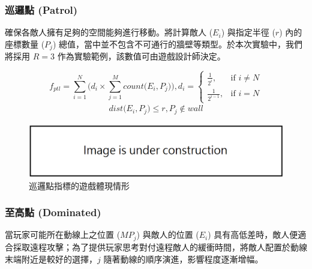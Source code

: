 \subsubsection{巡邏點 (Patrol)}
\label{sssec:method-segments-fitnesses-patrol}

確保各敵人擁有足夠的空間能夠進行移動。將計算敵人 ($E_{i}$) 與指定半徑 ($r$) 內的座標數量 ($P_j$) 總值，當中並不包含不可通行的牆壁等類型。於本次實驗中，我們將採用 $R=3$ 作為實驗範例，該數值可由遊戲設計師決定。

\begin{equation}
    f_{ptl} = \sum_{i=1}^{N} \Big( d_{i} \times \sum_{j=1}^{M} count\big(E_{i}, P_{j}\big) \Big), 
    d_{i} = \begin{cases}
                \frac{1}{2^{i}},   & \mbox{if } i \neq N \\
                \frac{1}{2^{i-1}}, & \mbox{if } i = N
            \end{cases}
\end{equation}
\begin{gather*}
    dist\big(E_{i}, P_{j}\big) \leq r,  P_{j} \notin wall
\end{gather*}

\begin{figure}[ht]
  \begin{center}
    \includegraphics[width=1.0\textwidth]{figures/under_construction.png}
    \caption{巡邏點指標的遊戲體現情形}
    \label{fig:fitnesses-patrol-gameplay}
  \end{center}
\end{figure}

\subsubsection{至高點 (Dominated)}
\label{sssec:method-segments-fitnesses-dominated}

當玩家可能所在動線上之位置 ($MP_{j}$) 與敵人的位置 ($E_{i}$) 具有高低差時，敵人便適合採取遠程攻擊；為了提供玩家思考對付遠程敵人的緩衝時間，將敵人配置於動線末端附近是較好的選擇，$j$ 隨著動線的順序演進，影響程度逐漸增幅。

